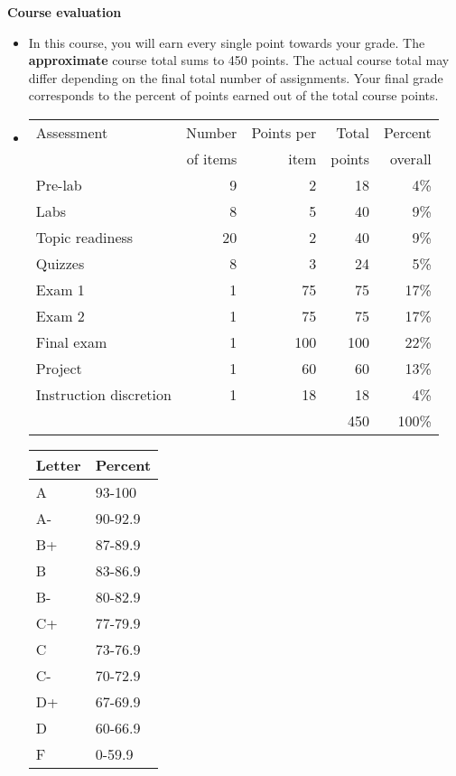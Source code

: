 \documentclass[letterpaper,12pt]{report}
\begin{document}
\textbf{Course evaluation}
\begin{itemize}
\item[] In this course, you will earn every single point towards your grade.  The \textbf{approximate} course total sums to 450 points. The actual course total may differ depending on the final total number of assignments. Your final grade corresponds to the percent of points earned out of the total course points.
\item[]
\begin{minipage}{0.7\textwidth}
\begin{tabular}{lrrrr}
\hline
Assessment	    &	Number      &	Points per	&	Total 	&	Percent 	\\
        	    &	of items	&	item	    &	points	&	overall	\\
\hline
Pre-lab	        &	9	&	2	&	18	&	4\%	\\
Labs	        &	8	&	5	&	40	&	9\%	\\
Topic readiness	&	20	&	2	&	40	&	9\%	\\
Quizzes	        &	8	&	3	&	24	&	5\%	\\
Exam 1	        &	1	&	75	&	75	&	17\%	\\
Exam 2	        &	1	&	75	&	75	&	17\%	\\
Final exam      &	1	&	100	&	100	&	22\%	\\
Project 	    &	1	&	60	&	60	&	13\%	\\
Instruction discretion 	&	1	&	18	&	18	&	4\%	\\
\hline
	            &		&		&	450	&	100\%	\\
\end{tabular}
\end{minipage}
\begin{minipage}{0.05\textwidth} \hspace{0.05in} \end{minipage}
\begin{minipage}{0.25\textwidth}
\begin{tabular}{|ll|}
\hline
Letter & Percent \\
\hline
A	&	93-100	\\
A-	&	90-92.9	\\
B+	&	87-89.9	\\
B	&	83-86.9	\\
B-	&	80-82.9	\\
C+	&	77-79.9	\\
C	&	73-76.9	\\
C-	&	70-72.9	\\
D+	&	67-69.9	\\
D	&	60-66.9	\\
F	&	0-59.9	\\
\hline
\end{tabular}

 \end{minipage}
\end{itemize}
\end{document}
